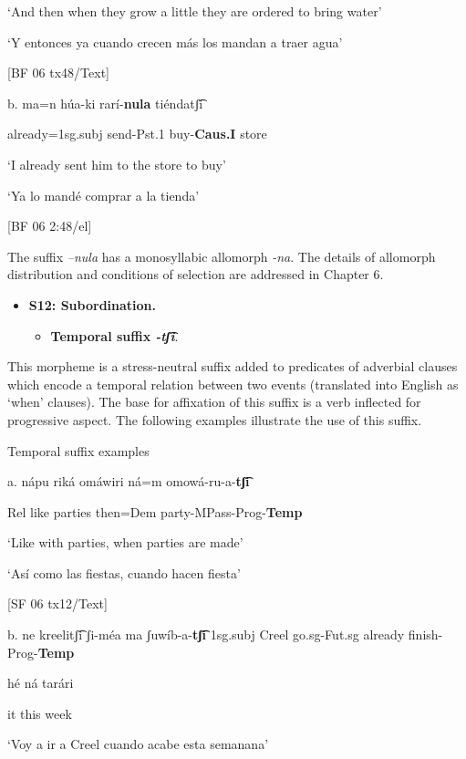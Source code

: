  ‘And then when they grow a little they are ordered to bring water’

‘Y entonces ya cuando crecen más los mandan a traer agua’

[BF 06 tx48/Text]

b.   ma=n        húa-ki               rarí-\textbf{nula} tiéndatʃ͡i

already=1sg.subj   send-Pst.1  buy-\textbf{Caus.I}   store

‘I already sent him to the store to buy’ 

‘Ya lo mandé comprar a la tienda’      

[BF 06 2:48/el]


  The suffix \textit{–nula} has a monosyllabic allomorph \textit{{}-na}. The details of allomorph distribution and conditions of selection are addressed in Chapter 6.



\begin{itemize}
\item \textbf{S12: Subordination.}

\begin{itemize}
\item \textbf{Temporal suffix \textit{{}-tʃ͡i}}.
\end{itemize}
\end{itemize}

This morpheme is a stress-neutral suffix added to predicates of adverbial clauses which encode a temporal relation between two events (translated into English as ‘when’ clauses). The base for affixation of this suffix is a verb inflected for progressive aspect. The following examples illustrate the use of this suffix.

   Temporal suffix examples

a.   nápu   riká   omáwiri   ná=m     omowá-ru-a-\textbf{tʃ͡i}

Rel  like  parties    then=Dem  party-MPass-Prog-\textbf{Temp}

 ‘Like with parties, when parties are made’

‘Así como las fiestas, cuando hacen fiesta’    

[SF 06 tx12/Text]

b.    ne     kreelitʃ͡i  ʃi-méa     ma   ʃuwíb-a-\textbf{tʃ͡i}       1sg.subj  Creel    go.sg-Fut.sg  already  finish-Prog-\textbf{Temp}

hé   ná   tarári

it  this  week

‘Voy a ir a Creel cuando acabe esta semanana’

